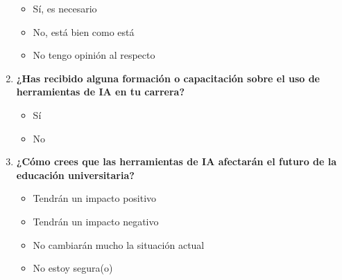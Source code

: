 \documentclass{article}
\newenvironment{recoleccionDeInformacion}{}{}
\begin{document}
\begin{recoleccionDeInformacion}
\begin{multicols}{2}
\begin{enumerate}
      \begin{itemize}
        \item Sí, es necesario
        \item No, está bien como está
        \item No tengo opinión al respecto
      \end{itemize}
      \item \textbf{¿Has recibido alguna formación o capacitación sobre el uso de herramientas de IA en tu carrera?}
      \begin{itemize}
        \item Sí
        \item No
      \end{itemize}
      \item \textbf{¿Cómo crees que las herramientas de IA afectarán el futuro de la educación universitaria?}
      \begin{itemize}
        \item Tendrán un impacto positivo
        \item Tendrán un impacto negativo
        \item No cambiarán mucho la situación actual
        \item No estoy segura(o)
      \end{itemize}
  \end{enumerate}
  \end{multicols}
\end{recoleccionDeInformacion}

\newpage
\end{document}
